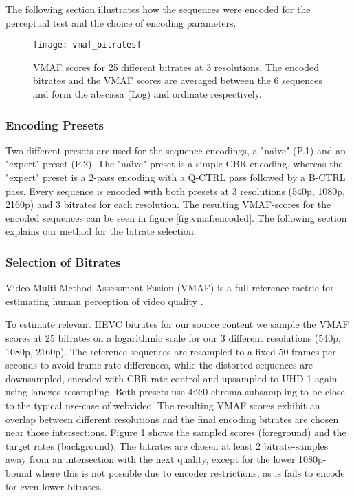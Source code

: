 The following section illustrates how the sequences were encoded for the perceptual test and the choice of encoding parameters.

\begin{figure}[!t]
	\centering
	\texttt{[image: vmaf\_bitrates]}
	\caption{VMAF scores for 25 different bitrates at 3 resolutions. The encoded bitrates and the VMAF scores are averaged between the 6 sequences and form the abscissa (Log) and ordinate respectively.}
	\label{fig:vmaf:bitrates}
\end{figure}

\subsubsection{Encoding Presets}
Two different presets are used for the sequence encodings, a "na\"{\i}ve" (P.1) and an "expert" preset (P.2). The "na\"{\i}ve" preset is a simple CBR encoding, whereas the "expert" preset is a 2-pass encoding with a Q-CTRL pass followed by a B-CTRL pass.  Every sequence is encoded with both presets at 3 resolutions (540p, 1080p, 2160p) and 3 bitrates for each resolution. The resulting VMAF-scores for the encoded sequences can be seen in figure \ref{fig:vmaf:encoded}. The following section explains our method for the bitrate selection.

\subsubsection{Selection of Bitrates}
Video Multi-Method Assessment Fusion (VMAF) is a full reference metric for estimating human perception of video quality \cite{lin2014:fvqa}.

To estimate relevant HEVC bitrates for our source content we sample the VMAF scores at 25 bitrates on a logarithmic scale for our 3 different resolutions (540p, 1080p, 2160p). The reference sequences are resampled to a fixed 50 frames per seconds to avoid frame rate differences, while the distorted sequences are downsampled, encoded with CBR rate control and upsampled to UHD-1 again using lanczos resampling. Both presets use 4:2:0 chroma subsampling to be close to the typical use-case of webvideo. The resulting VMAF scores exhibit an overlap between different resolutions and the final encoding bitrates are chosen near those intersections. Figure \ref{fig:vmaf:bitrates} shows the sampled scores (foreground) and the target rates (background). The bitrates are chosen at least 2 bitrate-samples away from an intersection with the next quality, except for the lower 1080p-bound where this is not possible due to encoder restrictions, as is fails to encode for even lower bitrates.

